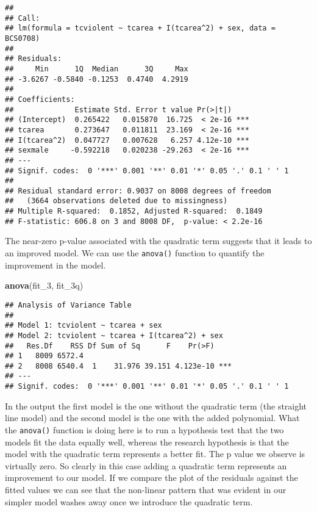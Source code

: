 \documentclass[
]{book}
\newenvironment{Shaded}{\begin{snugshade}}{\end{snugshade}}
\newcommand{\FunctionTok}[1]{\textcolor[rgb]{0.13,0.29,0.53}{\textbf{#1}}}
\newcommand{\NormalTok}[1]{#1}
\begin{document}
\begin{verbatim}
## 
## Call:
## lm(formula = tcviolent ~ tcarea + I(tcarea^2) + sex, data = BCS0708)
## 
## Residuals:
##     Min      1Q  Median      3Q     Max 
## -3.6267 -0.5840 -0.1253  0.4740  4.2919 
## 
## Coefficients:
##              Estimate Std. Error t value Pr(>|t|)    
## (Intercept)  0.265422   0.015870  16.725  < 2e-16 ***
## tcarea       0.273647   0.011811  23.169  < 2e-16 ***
## I(tcarea^2)  0.047727   0.007628   6.257 4.12e-10 ***
## sexmale     -0.592218   0.020238 -29.263  < 2e-16 ***
## ---
## Signif. codes:  0 '***' 0.001 '**' 0.01 '*' 0.05 '.' 0.1 ' ' 1
## 
## Residual standard error: 0.9037 on 8008 degrees of freedom
##   (3664 observations deleted due to missingness)
## Multiple R-squared:  0.1852, Adjusted R-squared:  0.1849 
## F-statistic: 606.8 on 3 and 8008 DF,  p-value: < 2.2e-16
\end{verbatim}

The near-zero p-value associated with the quadratic term suggests that it leads to an improved model. We can use the \texttt{anova()} function to quantify the improvement in the model.

\begin{Shaded}
\begin{Highlighting}[]
\FunctionTok{anova}\NormalTok{(fit\_3, fit\_3q)}
\end{Highlighting}
\end{Shaded}

\begin{verbatim}
## Analysis of Variance Table
## 
## Model 1: tcviolent ~ tcarea + sex
## Model 2: tcviolent ~ tcarea + I(tcarea^2) + sex
##   Res.Df    RSS Df Sum of Sq      F    Pr(>F)    
## 1   8009 6572.4                                  
## 2   8008 6540.4  1    31.976 39.151 4.123e-10 ***
## ---
## Signif. codes:  0 '***' 0.001 '**' 0.01 '*' 0.05 '.' 0.1 ' ' 1
\end{verbatim}

In the output the first model is the one without the quadratic term (the straight line model) and the second model is the one with the added polynomial. What the \texttt{anova()} function is doing here is to run a hypothesis test that the two models fit the data equally well, whereas the research hypothesis is that the model with the quadratic term represents a better fit. The p value we observe is virtually zero. So clearly in this case adding a quadratic term represents an improvement to our model. If we compare the plot of the residuals against the fitted values we can see that the non-linear pattern that was evident in our simpler model washes away once we introduce the quadratic term.
\end{document}
